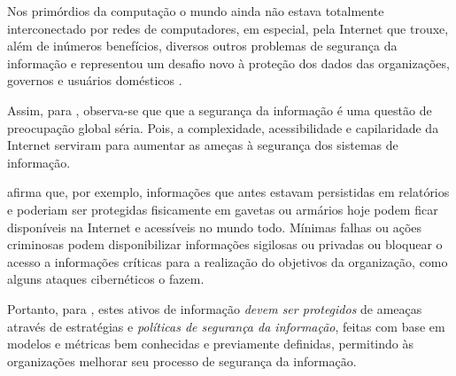 Nos primórdios da computação o mundo ainda não estava totalmente interconectado por redes de computadores, em especial, pela Internet que trouxe, além de inúmeros benefícios, diversos outros problemas de segurança da informação e representou um desafio novo à proteção dos dados das organizações, governos e usuários domésticos \cite{fontes_politicas}. 

Assim, para , observa-se que que a segurança da informação é uma questão de preocupação global séria. Pois, a complexidade, acessibilidade e capilaridade da Internet serviram para aumentar as ameças à segurança dos sistemas de informação.

 afirma que, por exemplo, informações que antes estavam persistidas em relatórios e poderiam ser protegidas fisicamente em gavetas ou armários hoje podem ficar disponíveis na Internet e acessíveis no mundo todo. Mínimas falhas ou ações criminosas podem disponibilizar informações sigilosas ou privadas ou bloquear o acesso a informações críticas para a realização do objetivos da organização, como alguns ataques cibernéticos o fazem.

Portanto, para , estes ativos de informação \textit{devem ser protegidos} de ameaças através de estratégias e \textit{políticas de segurança  da  informação},  feitas com  base  em  modelos  e  métricas bem  conhecidas e previamente definidas, permitindo  às  organizações  melhorar  seu processo de segurança da informação.

%
%
%
%

